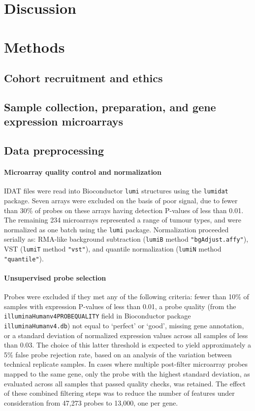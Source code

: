 \documentclass[dissertation.tex]{subfiles}
\begin{document}
\section{Discussion}

\section{Methods}
\subsection{Cohort recruitment and ethics}

\subsection{Sample collection, preparation, and gene expression microarrays}

\subsection{Data preprocessing}
\paragraph{Microarray quality control and normalization}
\gls{IDAT} files were read into Bioconductor \texttt{lumi} structures using the \texttt{lumidat} package.  Seven arrays were excluded on the basis of poor signal, due to fewer than 30\% of probes on these arrays having detection P-values of less than 0.01.  The remaining 234 microarrays represented a range of tumour types, and were normalized as one batch using the \texttt{lumi} package.  Normalization proceeded serially as: RMA-like background subtraction (\texttt{lumiB} method \texttt{"bgAdjust.affy"}), \gls{VST} (\texttt{lumiT} method \texttt{"vst"}), and quantile normalization (\texttt{lumiN} method \texttt{"quantile"}).

\paragraph{Unsupervised probe selection}
Probes were excluded if they met any of the following criteria: fewer than 10\% of samples with expression P-values of less than 0.01, a probe quality (from the \texttt{illuminaHumanv4PROBEQUALITY} field in Bioconductor package \texttt{illuminaHumanv4.db}) not equal to `perfect' or `good', missing gene annotation, or a standard deviation of normalized expression values across all samples of less than 0.03.  The choice of this latter threshold is expected to yield approximately a 5\% false probe rejection rate, based on an analysis of the variation between technical replicate samples.  In cases where multiple post-filter microarray probes mapped to the same gene, only the probe with the highest standard deviation, as evaluated across all samples that passed quality checks, was retained.  The effect of these combined filtering steps was to reduce the number of features under consideration from 47,273 probes to 13,000, one per gene.
\end{document}
